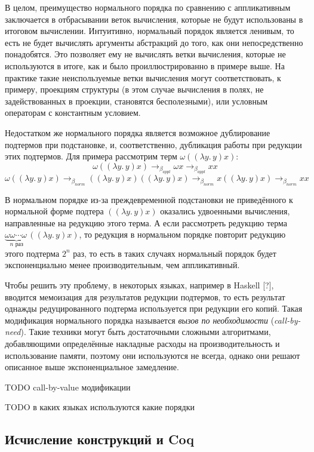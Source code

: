 \documentclass[../diploma.tex]{subfiles}
\begin{document}
В целом, преимущество нормального порядка по сравнению с аппликативным заключается в отбрасывании веток вычисления, которые не будут использованы в итоговом вычислении. Интуитивно, нормальный порядок является ленивым, то есть не будет вычислять аргументы абстракций до того, как они непосредственно понадобятся. Это позволяет ему не вычислять ветки вычисления, которые не используются в итоге, как и было проиллюстрированно в примере выше. На практике такие неиспользуемые ветки вычисления могут соответствовать, к примеру, проекциям структуры (в этом случае вычисления в полях, не задействованных в проекции, становятся бесполезными), или условным операторам с константным условием.

Недостатком же нормального порядка является возможное дублирование подтермов при подстановке, и, соответственно, дубликация работы при редукции этих подтермов. Для примера рассмотрим терм $\omega ((\lambda y.\, y) x)$: $$\omega ((\lambda y.\, y) x) \rightarrow_{\beta_{appl}} \omega x \rightarrow_{\beta_{appl}} x x$$ $$ \omega ((\lambda y.\, y) x) \rightarrow_{\beta_{norm}} ((\lambda y.\, y) x) ((\lambda y.\, y) x) \rightarrow_{\beta_{norm}} x ((\lambda y.\, y) x) \rightarrow_{\beta_{norm}} x x$$

В нормальном порядке из-за преждевременной подстановки не приведённого к нормальной форме подтера $((\lambda y.\, y) x)$ оказались удвоенными вычисления, направленные на редукцию этого терма. А если рассмотреть редукцию терма $\underbrace{\omega\omega\cdots\omega\,}_\text{$n$ раз}((\lambda y.\, y) x)$, то редукция в нормальном порядке повторит редукцию этого подтерма $2^n$ раз, то есть в таких случаях нормальный порядок будет экспоненциально менее производительным, чем аппликативный.

Чтобы решить эту проблему, в некоторых языках, например в Haskell [?], вводится мемоизация для результатов редукции подтермов, то есть результат однажды редуцированного подтерма используется при редукции его копий. Такая модификация нормального порядка называется \textit{вызов по необходимости} (\textit{call-by-need}). Такие техники могут быть достаточными сложными алгоритмами, добавляющими определённые накладные расходы на производительность и использование памяти, поэтому они используются не всегда, однако они решают описанное выше экспоненциальное замедление.

TODO call-by-value модификации

TODO в каких языках используются какие порядки

\subsection{Исчисление конструкций и Coq}
\end{document}
